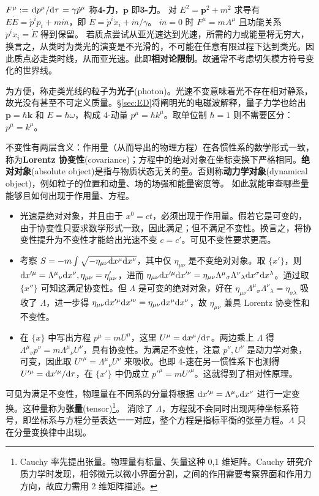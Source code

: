 $F^\mu:=\dv*{p^\mu}{\tau}=\gamma \dot p^\mu$ 称\textbf{4-力}，$\dot{\bm p}$ 即\textbf{3-力}。
对 $E^2=\bm p^2+m^2$ 求导有 $E\dot E=\dot p^i p_i+m\dot m$，即 $\dot E=\dot p^i\dot x_i+\dot m/\gamma$。
$\dot m=0$ 时 $F^\mu=m A^\mu$ 且功能关系 $\dot p^i \dot{x}_i=\dot{E}$ 得到保留。
若质点尝试从亚光速达到光速，所需的力或能量将无穷大，换言之，从类时为类光的演变是不光滑的，不可能在任意有限过程下达到类光。因此质点必走类时线，从而亚光速。此即\textbf{相对论限制}。故通常不考虑切矢模方符号变化的世界线。

为方便，称走类光线的粒子为\textbf{光子}(photon)。光速不变意味着光不存在相对静系，故光没有甚至不可定义质量。\S\ref{sec:ED}将阐明光的电磁波解释，量子力学也给出 $\bm p = \hbar\bm k$ 和 $E=\hbar\omega$，构成 4-动量 $p^\mu=\hbar k^\mu$。取单位制 $\hbar=1$ 则不需要区分：$p^\mu=k^\mu$。

不变性有两层含义：作用量（从而导出的物理方程）在各惯性系的数学形式一致，称为\textbf{Lorentz 协变性}(covariance)；方程中的绝对对象在坐标变换下严格相同。\textbf{绝对对象}(absolute object)是指与物质状态无关的量。否则称\textbf{动力学对象}(dynamical object)，例如粒子的位置和动量、场的场强和能量密度等。
如此就能审查哪些量能够且如何出现于作用量、方程。
\begin{itemize}
    \item 光速是绝对对象，并且由于 $x^0=ct$，必须出现于作用量。假若它是可变的，由于协变性只要求数学形式一致，因此满足；但不满足不变性。换言之，将协变性提升为不变性才能给出光速不变 $c=c'$。可见不变性要求更高。
    \item 考察 $S=-m\int\sqrt{-\eta_{\mu\nu}\dd x^\mu \dd x^\nu}$，其中仅 $\eta_{\mu\nu}$ 是不变绝对对象。取 $\{x'\}$，则 $\dd x'^\mu=\Lambda^\mu{}_\nu \dd x^\nu, \eta_{\mu\nu}=\eta_{\mu\nu}'$，进而 $\eta_{\mu\nu}\dd x'^\mu \dd x'^\nu=\eta_{\mu\nu}\Lambda^{\mu}{}_{\sigma}{\Lambda^{\nu}}_{\lambda}\dd x^\sigma \dd x^\lambda$。通过取 $\{x''\}$ 可知这满足协变性。但 $\Lambda$ 是可变的绝对对象，好在 $\eta_{\mu\nu}\Lambda^{\mu}{}_{\sigma}{\Lambda^{\nu}}_{\lambda}={\eta}_{\sigma\lambda}$ 吸收了 $\Lambda$，进一步得 $\eta_{\mu\nu}\dd x'^\mu \dd x'^\nu=\eta_{\mu\nu}\dd x^\mu \dd x^\nu$，故 $\eta_{\mu\nu}$ 兼具 Lorentz 协变性和不变性。
    \item 在 $\{x\}$ 中写出方程 $p^\mu=m U^\mu$，这里 $U^\mu=\dd x^\mu/\dd\tau$。两边乘上 $\Lambda$ 得 $\Lambda^\mu{}_\nu p^\nu = m \Lambda^\mu{}_\nu U^\nu$，具有协变性。为满足不变性，注意 $p^\nu,U^\nu$ 是动力学对象，可变，因此取 $U'^\mu=\Lambda^\mu{}_\nu U^\nu$ 来吸收。也即 4-速在另一惯性系下也测得 $U'^\mu=\dd x'^\mu/\dd\tau$，在 $\{x'\}$ 中仍成立 $p'^\mu=m U'^\mu$。这就得到了相对性原理。
\end{itemize}
可见为满足不变性，物理量在不同系的分量将根据 $\dd x'^\mu=\Lambda^\mu{}_\nu \dd x^\nu$ 进行一定变换。这种量称为\textbf{张量}(tensor)\footnote{Cauchy 率先提出张量。物理量有标量、矢量这种 0,1 维矩阵。Cauchy 研究介质力学时发现，相邻微元以微小界面分割，之间的作用需要考察界面和作用力方向，故应力需用 2 维矩阵描述。}。
消除了 $\Lambda$，方程就不会同时出现两种坐标系符号，即坐标系与方程分量表达一一对应，整个方程是指标平衡的张量方程。$\Lambda$ 只在分量变换律中出现。


